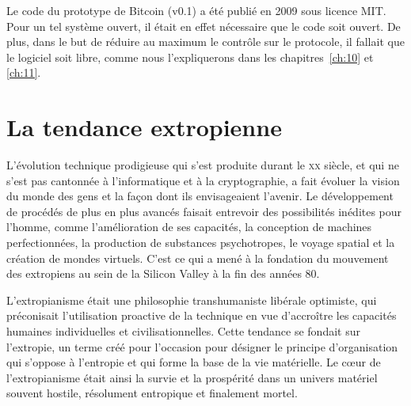 Le code du prototype de Bitcoin (v0.1) a été publié en 2009 sous licence MIT. Pour un tel système ouvert, il était en effet nécessaire que le code soit ouvert. De plus, dans le but de réduire au maximum le contrôle sur le protocole, il fallait que le logiciel soit libre, comme nous l'expliquerons dans les chapitres~\ref{ch:10} et \ref{ch:11}.


\section*{La tendance extropienne}

L'évolution technique prodigieuse qui s'est produite durant le \textsc{xx}\ieme{} siècle, et qui ne s'est pas cantonnée à l'informatique et à la cryptographie, a fait évoluer la vision du monde des gens et la façon dont ils envisageaient l'avenir. Le développement de procédés de plus en plus avancés faisait entrevoir des possibilités inédites pour l'homme, comme l'amélioration de ses capacités, la conception de machines perfectionnées, la production de substances psychotropes, le voyage spatial et la création de mondes virtuels. C'est ce qui a mené à la fondation du mouvement des extropiens au sein de la Silicon Valley à la fin des années 80.


L'extropianisme était une philosophie transhumaniste libérale optimiste, qui préconisait l'utilisation proactive de la technique en vue d'accroître les capacités humaines individuelles et civilisationnelles. Cette tendance se fondait sur l'extropie, un terme créé pour l'occasion pour désigner le principe d'organisation qui s'oppose à l'entropie et qui forme la base de la vie matérielle. Le cœur de l'extropianisme était ainsi la survie et la prospérité dans un univers matériel souvent hostile, résolument entropique et finalement mortel.

